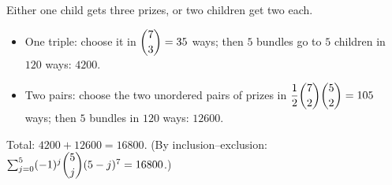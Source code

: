 Either one child gets three prizes, or two children get two each.
\begin{itemize}
\item One triple: choose it in $\dbinom73=35$ ways; then $5$ bundles go to $5$ children in $120$ ways: $4200$.
\item Two pairs: choose the two unordered pairs of prizes in $\dfrac{1}{2}\dbinom72\dbinom52=105$ ways; then $5$ bundles in $120$ ways: $12600$.
\end{itemize}
Total: $4200+12600=\boxed{16800}$. (By inclusion--exclusion: $\sum_{j=0}^{5}(-1)^j\dbinom5j(5-j)^7=16800$.)
